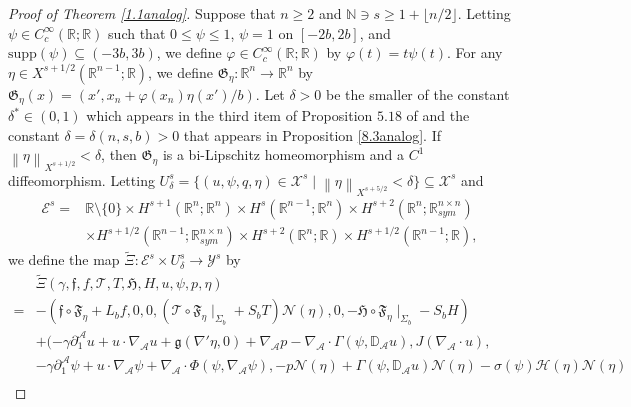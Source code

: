 \documentclass[11pt,letterpaper,reqno]{amsart}
\numberwithin{equation}{section}
\newcommand{\norm}[1]{\left\lVert#1\right\rVert}
\newcommand{\supp}{\mbox{supp}}
\begin{document}
\begin{proof}[Proof of Theorem \ref{1.1analog}]
    Suppose that \(n \geq 2\) and \(\mathbb{N} \ni s \geq 1+ \lfloor n/2 \rfloor\). Letting \(\psi \in C_{c}^{\infty}(\mathbb{R};\mathbb{R})\) such that \(0 \leq \psi \leq 1\), \(\psi=1\) on \([-2b,2b]\), and \(\supp(\psi) \subseteq (-3b,3b)\), we define \(\varphi \in C_{c}^{\infty}(\mathbb{R};\mathbb{R})\) by \(\varphi(t)=t\psi(t)\). For any \(\eta \in X^{s+1/2}(\mathbb{R}^{n-1};\mathbb{R})\), we define \(\mathfrak{G}_{\eta}:\mathbb{R}^{n} \to \mathbb{R}^{n}\) by \(\mathfrak{G}_{\eta}(x)=(x',x_{n}+\varphi(x_{n})\eta(x')/b)\). Let \(\delta>0\) be the smaller of the constant \(\delta^{*} \in (0,1)\) which appears in the third item of Proposition \(5.18\) of \cite{leoni2023traveling} and the constant \(\delta=\delta(n,s,b)>0\) that appears in Proposition \ref{8.3analog}. If \(\norm{\eta}_{X^{s+1/2}}<\delta\), then \(\mathfrak{G}_{\eta}\) is a bi-Lipschitz homeomorphism and a \(C^{1}\) diffeomorphism. Letting \(U_{\delta}^{s}=\{(u,\psi,q,\eta) \in \mathcal{X}^{s} \mid \norm{\eta}_{X^{s+5/2}}<\delta\} \subseteq \mathcal{X}^{s}\) and
\begin{align}
    \mathcal{E}^{s}=& \mathbb{R} \setminus \{0\} \times H^{s+1}(\mathbb{R}^{n};\mathbb{R}^{n}) \times H^{s}(\mathbb{R}^{n-1};\mathbb{R}^{n}) \times H^{s+2}(\mathbb{R}^{n};\mathbb{R}_{sym}^{n \times n}) \nonumber\\
        &\times H^{s+1/2}(\mathbb{R}^{n-1};\mathbb{R}_{sym}^{n \times n}) \times H^{s+2}(\mathbb{R}^{n};\mathbb{R}) \times H^{s+1/2}(\mathbb{R}^{n-1};\mathbb{R}),
\end{align}
we define the map \(\widetilde{\Xi}:\mathcal{E}^{s} \times U_{\delta}^{s} \to \mathcal{Y}^{s}\) by
 \begin{align}
     &\widetilde{\Xi}(\gamma,\mathfrak{f},f, \mathcal{T},T,\mathfrak{H},H, u, \psi,p,\eta) \nonumber\\
     =&-(\mathfrak{f}\circ \mathfrak{F}_{\eta}+L_{b}f,0,0,(\mathcal{T} \circ \mathfrak{F}_{\eta} \mid_{\Sigma_{b}}+S_{b}T)\mathcal{N}(\eta),0,-\mathfrak{H} \circ \mathfrak{F}_{\eta}\mid_{\Sigma_{b}}-S_{b}H) \nonumber \\
     &+(-\gamma \partial_{1}^{\mathcal{A}}u + u \cdot \nabla_{\mathcal{A}}u+\mathfrak{g}(\nabla'\eta,0) + \nabla_{\mathcal{A}}p-\nabla_{\mathcal{A}}\cdot \Gamma(\psi,\mathbb{D}_{\mathcal{A}}u),J(\nabla_{\mathcal{A}}\cdot u), \nonumber \\
     &-\gamma \partial_{1}^{\mathcal{A}}\psi + u \cdot \nabla_{\mathcal{A}}\psi +\nabla_{\mathcal{A}} \cdot \Phi(\psi,\nabla_{\mathcal{A}}\psi),-p\mathcal{N}(\eta)+\Gamma(\psi,\mathbb{D}_{\mathcal{A}}u)\mathcal{N}(\eta)-\sigma(\psi)\mathcal{H}(\eta)\mathcal{N}(\eta)\nonumber\\

\end{align}
\end{proof}
\end{document}
